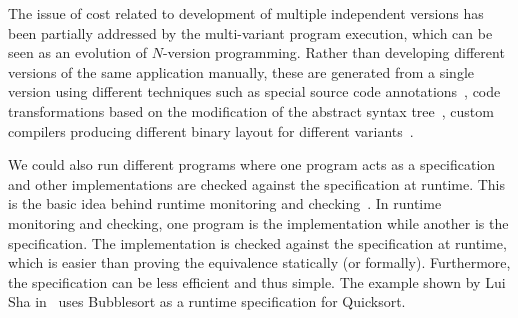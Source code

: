 The issue of cost related to development of multiple independent versions has
been partially addressed by the multi-variant program execution, which can be seen
as an evolution of $N$-version programming. Rather than developing different versions
of the same application manually, these are generated from a single version
using different techniques such as special source code
annotations~\cite{onlinevalidation,trachsel10}, code transformations based on
the modification of the abstract syntax tree~\cite{schulte14,sosie:issta14},
custom compilers producing different binary layout for different
variants~\cite{orchestra09,unibus:nspw10}. %

We could also run different programs where one program acts as a specification
and other implementations are checked against the specification at runtime.
This is the basic idea behind runtime monitoring and
checking~\cite{kim:mac,java-mac01}. In runtime monitoring and checking, one
program is the implementation while another is the specification. The
implementation is checked against the specification at runtime, which is easier
than proving the equivalence statically (or formally).  Furthermore, the
specification can be less efficient and thus simple. The example shown by Lui
Sha in~\cite{lui01} uses Bubblesort as a runtime specification for Quicksort.




